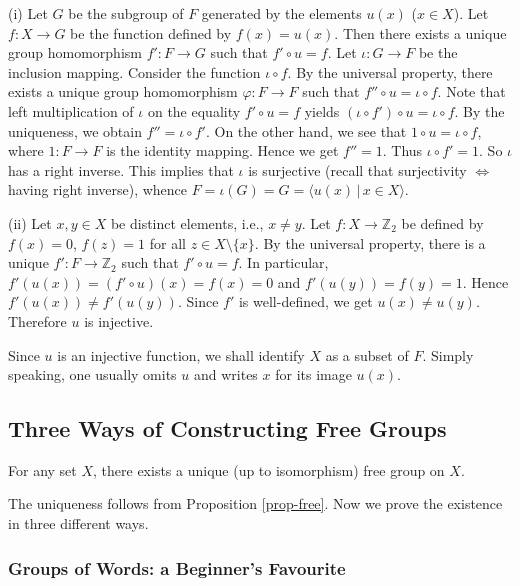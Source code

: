 \begin{sketch}
	(i) Let $G$ be the subgroup of $F$ generated by the elements $u(x)$ ($x\in X$). Let $f:X\rightarrow G$ be the function defined by $f(x) = u(x)$. Then there exists a unique group homomorphism $f':F\rightarrow G$ such that $f'\circ u = f$. Let $\iota:G\rightarrow F$ be the inclusion mapping. Consider the function $\iota\circ f$.  By the universal property, there exists a unique group homomorphism $\varphi:F\rightarrow F$ such that $f''\circ u = \iota\circ f$. Note that left multiplication of $\iota$ on the equality $f'\circ u = f$ yields $(\iota\circ f') \circ u = \iota\circ f$. By the uniqueness, we obtain $f'' =\iota\circ f'$. On the other hand, we see that $1\circ u = \iota\circ f$, where $1:F\rightarrow F$ is the identity mapping. Hence we get $f''= 1$. Thus $\iota\circ f' = 1$. So $\iota$ has a right inverse. This implies that $\iota$ is surjective (recall that surjectivity $\Leftrightarrow$ having right inverse), whence  $F = \iota(G) = G = \langle u(x)\,|\, x\in X\rangle$.
	
	(ii) Let $x,y\in X$ be distinct elements, i.e., $x\neq y$. Let $f:X\rightarrow \mathbb{Z}_2$ be defined by $f(x) = 0$, $f(z) = 1$ for all $z\in X\setminus\{x\}$. By the universal property, there is a unique $f':F\rightarrow \mathbb{Z}_2$ such that $f'\circ u = f$. In particular, $f'(u(x)) = (f'\circ u)(x) = f(x) = 0$ and $f'(u(y)) =  f(y) = 1$. Hence $f'(u(x)) \neq f'(u(y))$. Since $f'$ is well-defined, we get $u(x) \neq u(y)$. Therefore  $u$ is injective.
\end{sketch}
\begin{remark}
	Since $u$ is an injective function, we shall identify $X$ as a subset of $F$. Simply speaking, one usually omits $u$ and writes $x$ for its image $u(x)$. 
\end{remark}
\subsection{Three Ways of Constructing Free Groups}
\begin{theorem}
	For any set $X$, there exists a unique (up to isomorphism) free group on $X$.
\end{theorem}
The uniqueness follows from Proposition \ref{prop-free}. Now we prove the existence in three different ways.
\subsubsection{Groups of Words: a Beginner's Favourite}
